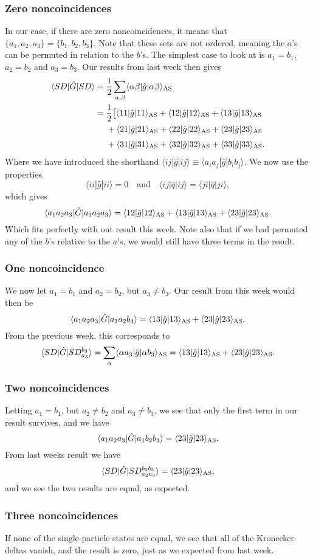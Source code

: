 \documentclass[a4paper, 11pt, notitlepage, english]{article}
\newcommand{\op}[1]{\hat{#1}}
\newcommand{\braopket}[3]{\langle #1 | {#2} | #3 \rangle}
\begin{document}
\subsubsection*{Zero noncoincidences}
In our case, if there are zero noncoincidences, it means that $\{a_1, a_2, a_3\} = \{b_1, b_2, b_3\}$. Note that these sets are not ordered, meaning the $a$'s can be permuted in relation to the $b$'s. The simplest case to look at is $a_1=b_1$, $a_2=b_2$ and $a_3=b_3$. Our results from last week then gives
\begin{align*}
\braopket{SD}{\op{G}}{SD}
&=  \frac{1}{2}\sum_{\alpha,\beta} \braopket{\alpha\beta}{\op{g}}{\alpha\beta}_{\rm AS} \\
&= \frac{1}{2}\big[ \braopket{11}{\op{g}}{11}_{\rm AS} + \braopket{12}{\op{g}}{12}_{\rm AS} + \braopket{13}{\op{g}}{13}_{\rm AS} \\
&\quad\ + \braopket{21}{\op{g}}{21}_{\rm AS} + \braopket{22}{\op{g}}{22}_{\rm AS} + \braopket{23}{\op{g}}{23}_{\rm AS} \\[0.1cm]
&\quad\ + \braopket{31}{\op{g}}{31}_{\rm AS} + \braopket{32}{\op{g}}{32}_{\rm AS} + \braopket{33}{\op{g}}{33}_{\rm AS}.
\end{align*}
Where we have introduced the shorthand $\braopket{ij}{\op{g}}{ij} \equiv \braopket{a_ia_j}{\op{g}}{b_ib_j}$. We now use the properties
$$\braopket{ii}{\op{g}}{ii} = 0 \quad \mbox{and} \quad \braopket{ij}{\op{q}}{ij}=\braopket{ji}{\op{q}}{ji},$$
which gives
$$\braopket{a_1a_2a_3}{\op{G}}{a_1a_2a_3} = \braopket{12}{\op{g}}{12}_{\rm AS} + \braopket{13}{\op{g}}{13}_{\rm AS} + \braopket{23}{\op{g}}{23}_{\rm AS}.$$
Which fits perfectly with out result this week. Note also that if we had permuted any of the $b$'s relative to the $a$'s, we would still have three terms in the result.

\subsubsection*{One noncoincidence}
We now let $a_1 = b_1$ and $a_2=b_2$, but $a_3 \neq b_3$. Our result from this week would then be
$$\braopket{a_1 a_2 a_3}{\op{G}}{a_1 a_2 b_3} = \braopket{13}{\op{g}}{13}_{\rm AS} + \braopket{23}{\op{g}}{23}_{\rm AS}.$$
From the previous week, this corresponds to
$$\braopket{SD}{\op{G}}{SD_{a_3}^{b_3}} = \sum_{\alpha} \braopket{\alpha a_3}{\op{g}}{\alpha b_3}_{\rm AS} = \braopket{13}{\op{g}}{13}_{\rm AS} + \braopket{23}{\op{g}}{23}_{\rm AS}.$$

\subsubsection*{Two noncoincidences}
Letting $a_1=b_1$, but $a_2 \neq b_2$ and $a_3 \neq b_3$, we see that only the first term in our result survives, and we have
$$\braopket{a_1 a_2 a_3}{\op{G}}{a_1 b_2 b_3} = \braopket{23}{\op{g}}{23}_{\rm AS}.$$
From last weeks result we have
$$\braopket{SD}{\op{G}}{SD_{a_2 a_3}^{b_2 b_3}} = \braopket{2 3}{\op{g}}{2 3}_{\rm AS},$$
and we see the two results are equal, as expected.

\subsubsection*{Three noncoincidences}
If none of the single-particle states are equal, we see that all of the Kronecker-deltas vanish, and the result is zero, just as we expected from last week.
\end{document}
